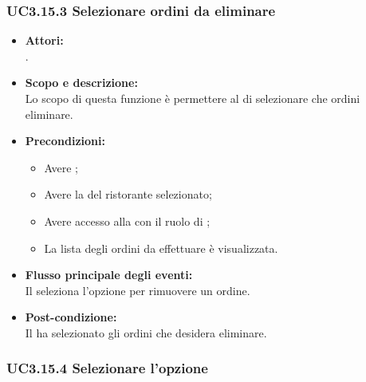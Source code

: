 \subsubsection{UC3.15.3 Selezionare ordini da eliminare} \label{UC3.15.3}

\begin{itemize}
	\item \textbf{Attori:}
	\\.
	\item \textbf{Scopo e descrizione:} 
	\\Lo scopo di questa funzione è permettere al  di selezionare che ordini eliminare.
	\item \textbf{Precondizioni:}
	\begin{itemize}
		\item Avere ;
		\item Avere la  del ristorante selezionato;
		\item Avere accesso alla  con il ruolo di ;
		\item La lista degli ordini da effettuare è visualizzata.
	\end{itemize}
	\item \textbf{Flusso principale degli eventi:}
	\\Il {} seleziona l'opzione per rimuovere un ordine.
	\item \textbf{Post-condizione:}
	\\Il {} ha selezionato gli ordini che desidera eliminare.
\end{itemize}

\subsubsection{UC3.15.4 Selezionare l'opzione } \label{UC3.15.4}

